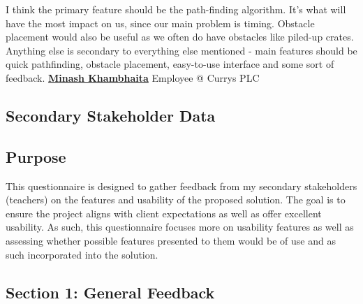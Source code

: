 I think the primary feature should be the path-finding algorithm. It's what will have the most impact on us, since our main problem is timing. Obstacle placement would also be useful as we often do have obstacles like piled-up crates. Anything else is secondary to everything else mentioned - main features should be quick pathfinding, obstacle placement, easy-to-use interface and some sort of feedback.
\vspace{2cm}
\newline
\textbf{\underline{Minash Khambhaita}} \newline
Employee @ Currys PLC

\newpage
\subsection{Secondary Stakeholder Data}

\subsection*{Purpose}
This questionnaire is designed to gather feedback from my secondary stakeholders (teachers) on the features and usability of the proposed solution. The goal is to ensure the project aligns with client expectations as well as offer excellent usability. As such, this questionnaire focuses more on usability features as well as assessing whether possible features presented to them would be of use and as such incorporated into the solution.

\subsection*{Section 1: General Feedback}

